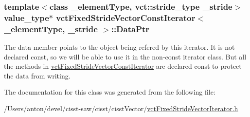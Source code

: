 \subsubsection[{Data\+Ptr}]{\setlength{\rightskip}{0pt plus 5cm}template$<$class \+\_\+element\+Type, vct\+::stride\+\_\+type \+\_\+stride$>$ value\+\_\+type$\ast$ {\bf vct\+Fixed\+Stride\+Vector\+Const\+Iterator}$<$ \+\_\+element\+Type, \+\_\+stride $>$\+::Data\+Ptr\hspace{0.3cm}{\ttfamily [protected]}}\label{classvct_fixed_stride_vector_const_iterator_a892f486c46b720c90ed18bb9bdb1793e}
The data member points to the object being refered by this iterator. It is not declared const, so we will be able to use it in the non-\/const iterator class. But all the methods in \hyperlink{classvct_fixed_stride_vector_const_iterator}{vct\+Fixed\+Stride\+Vector\+Const\+Iterator} are declared const to protect the data from writing. 

The documentation for this class was generated from the following file\+:\begin{DoxyCompactItemize}
\item 
/\+Users/anton/devel/cisst-\/saw/cisst/cisst\+Vector/\hyperlink{vct_fixed_stride_vector_iterator_8h}{vct\+Fixed\+Stride\+Vector\+Iterator.\+h}\end{DoxyCompactItemize}
